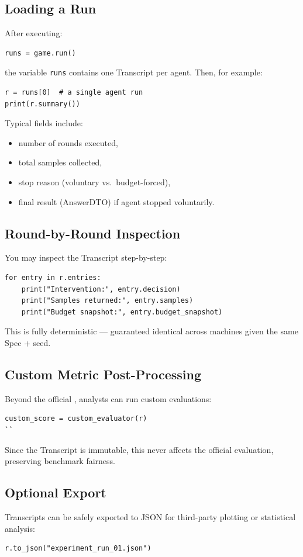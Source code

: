 \subsection{Loading a Run}
After executing:
\begin{verbatim}
runs = game.run()
\end{verbatim}
the variable \texttt{runs} contains one Transcript per agent.  
Then, for example:
\begin{verbatim}
r = runs[0]  # a single agent run
print(r.summary())
\end{verbatim}

Typical fields include:
\begin{itemize}
    \item number of rounds executed,
    \item total samples collected,
    \item stop reason (voluntary vs.\ budget-forced),
    \item final result (AnswerDTO) if agent stopped voluntarily.
\end{itemize}

\subsection{Round-by-Round Inspection}
You may inspect the Transcript step-by-step:
\begin{verbatim}
for entry in r.entries:
    print("Intervention:", entry.decision)
    print("Samples returned:", entry.samples)
    print("Budget snapshot:", entry.budget_snapshot)
\end{verbatim}

This is fully deterministic — guaranteed identical across machines given the same Spec + seed.

\subsection{Custom Metric Post-Processing}
Beyond the official \resultmetric{}, analysts can run custom evaluations:
\begin{verbatim}
custom_score = custom_evaluator(r)
``\end{verbatim}

Since the Transcript is immutable, this never affects the official evaluation, preserving benchmark fairness.

\subsection{Optional Export}
Transcripts can be safely exported to JSON for third-party plotting or statistical analysis:
\begin{verbatim}
r.to_json("experiment_run_01.json")
\end{verbatim}

